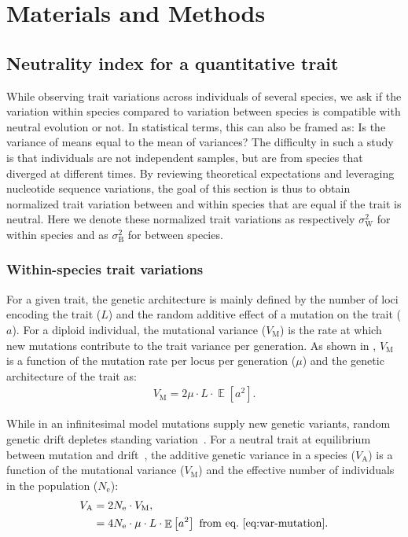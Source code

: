\documentclass{article}
\newcommand{\Multiply}{\cdot}
\DeclareMathOperator{\E}{\mathbb{E}}
\newcommand{\Ne}{N_{\text{e}}}
\newcommand{\MutationRatePheno}{\mu}
\newcommand{\NbrLoci}{L}
\newcommand{\VarGenetic}{V_{\mathrm{A}}}
\newcommand{\VarMutation}{V_{\mathrm{M}}}
\newcommand{\GenArchi}{\NbrLoci \Multiply \E \left[ a^2 \right]}
\newcommand{\RateBetween}{\sigma^2_{\mathrm{B}}}
\newcommand{\RateWhithin}{\sigma^2_{\mathrm{W}}}
\begin{document}
\section*{Materials and Methods}\label{sec:materials-and-methods}
\subsection*{Neutrality index for a quantitative trait}\label{subsec:neutrality-index-for-a-quantitative-trait}

While observing trait variations across individuals of several species, we ask if the variation within species compared to variation between species is compatible with neutral evolution or not.
In statistical terms, this can also be framed as: Is the variance of means equal to the mean of variances?
The difficulty in such a study is that individuals are not independent samples, but are from species that diverged at different times.
By reviewing theoretical expectations and leveraging nucleotide sequence variations, the goal of this section is thus to obtain normalized trait variation between and within species that are equal if the trait is neutral.
Here we denote these normalized trait variations as respectively $\RateWhithin$ for within species and as $\RateBetween$ for between species.

\subsubsection*{Within-species trait variations}

For a given trait, the genetic architecture is mainly defined by the number of loci encoding the trait ($\NbrLoci$) and the random additive effect of a mutation on the trait ($a$).
For a diploid individual, the mutational variance ($\VarMutation$) is the rate at which new mutations contribute to the trait variance per generation.
As shown in \citet{lande_quantitative_1979, lande_sexual_1980}, $\VarMutation$ is a function of the mutation rate per locus per generation ($\MutationRatePheno$) and the genetic architecture of the trait as:
\begin{gather}
    \VarMutation = 2 \MutationRatePheno \Multiply \GenArchi \label{eq:var-mutation}.
\end{gather}

While in an infinitesimal model mutations supply new genetic variants, random genetic drift depletes standing variation~\citep{turelli_commentary_2017, barton_infinitesimal_2017, sella_thinking_2019}.
For a neutral trait at equilibrium between mutation and drift~\citep{lynch_mutation_1998}, the additive genetic variance in a species ($\VarGenetic$) is a function of the mutational variance ($\VarMutation$) and the effective number of individuals in the population ($\Ne$):
\begin{align}
    \VarGenetic & =  2 \Ne \Multiply \VarMutation, \\
    & = 4 \Ne \Multiply \MutationRatePheno \Multiply \GenArchi \text{ from eq.~\ref{eq:var-mutation}}\label{eq:var-genetic}.
\end{align}
\end{document}
